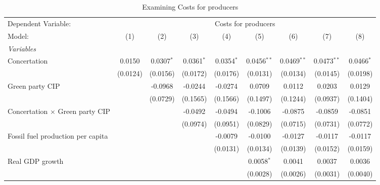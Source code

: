 
\begin{table}[htbp]
   \caption{Examining Costs for producers}
   \centering
   \begin{tabular}{lcccccccc}
      \tabularnewline \midrule \midrule
      Dependent Variable: & \multicolumn{8}{c}{Costs for producers}\\
      Model:                                  & (1)      & (2)          & (3)          & (4)          & (5)           & (6)           & (7)           & (8)\\  
      \midrule
      \emph{Variables}\\
      Concertation                            & 0.0150   & 0.0307$^{*}$ & 0.0361$^{*}$ & 0.0354$^{*}$ & 0.0456$^{**}$ & 0.0469$^{**}$ & 0.0473$^{**}$ & 0.0466$^{*}$\\   
                                              & (0.0124) & (0.0156)     & (0.0172)     & (0.0176)     & (0.0131)      & (0.0134)      & (0.0145)      & (0.0198)\\   
      Green party CIP                         &          & -0.0968      & -0.0244      & -0.0274      & 0.0709        & 0.0112        & 0.0203        & 0.0129\\   
                                              &          & (0.0729)     & (0.1565)     & (0.1566)     & (0.1497)      & (0.1244)      & (0.0937)      & (0.1404)\\   
      Concertation $\times$ Green party CIP   &          &              & -0.0492      & -0.0494      & -0.1006       & -0.0875       & -0.0859       & -0.0851\\   
                                              &          &              & (0.0974)     & (0.0951)     & (0.0829)      & (0.0715)      & (0.0731)      & (0.0772)\\   
      Fossil fuel production per capita       &          &              &              & -0.0079      & -0.0100       & -0.0127       & -0.0117       & -0.0117\\   
                                              &          &              &              & (0.0131)     & (0.0134)      & (0.0139)      & (0.0152)      & (0.0159)\\   
      Real GDP growth                         &          &              &              &              & 0.0058$^{*}$  & 0.0041        & 0.0037        & 0.0036\\   
                                              &          &              &              &              & (0.0028)      & (0.0026)      & (0.0031)      & (0.0040)\\   

\end{tabular}
\end{table}
